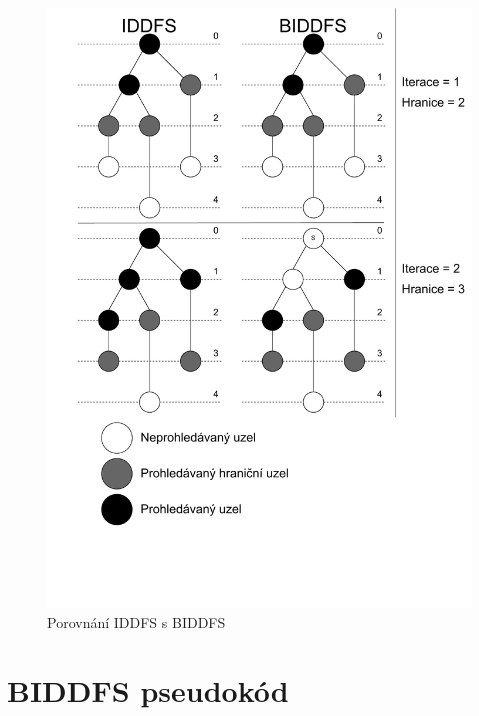 \documentclass[12pt]{report}
\begin{document}
	\begin{figure}[h]
	\centering
	\includegraphics[width=.7\textwidth]{img/biddfs}
	\caption{Porovnání IDDFS s BIDDFS}
	\label{fig:biddfs}
    \end{figure}
	
	
	\newpage
	
	
	\section*{BIDDFS pseudokód}
	
\end{document}
